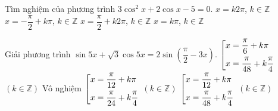 \begin{ex}%
	Tìm nghiệm của phương trình $3\cos^2 x+2\cos x-5=0$.
	\choice
	{\True $x=k2\pi$, $k \in \mathbb{Z}$}
	{$x=-\dfrac{\pi}{2}+k\pi$, $k \in \mathbb{Z}$}
	{$x=\dfrac{\pi}{2}+k2\pi$, $k \in \mathbb{Z}$}
	{$x=k\pi$, $k \in \mathbb{Z}$}
\end{ex}

\begin{ex}%
	Giải phương trình $\sin 5x+\sqrt{3}\cos 5x=2\sin \left(\dfrac{\pi}{2}-3x\right)$.
	\choice
	{$\left[\begin{aligned}&x=\dfrac{\pi}{6}+k\pi\\&x=\dfrac{\pi}{48}+k\dfrac{\pi}{4}\end{aligned}\right.$ $(k \in \mathbb{Z})$}
	{Vô nghiệm}
	{$\left[\begin{aligned}&x=\dfrac{\pi}{12}+k\pi\\&x=\dfrac{\pi}{24}+k\dfrac{\pi}{4}\end{aligned}\right.$ $(k \in \mathbb{Z})$}
	{\True $\left[\begin{aligned}&x=\dfrac{\pi}{12}+k\pi\\&x=\dfrac{\pi}{48}+k\dfrac{\pi}{4}\end{aligned}\right.$ $(k \in \mathbb{Z})$}
\end{ex}

